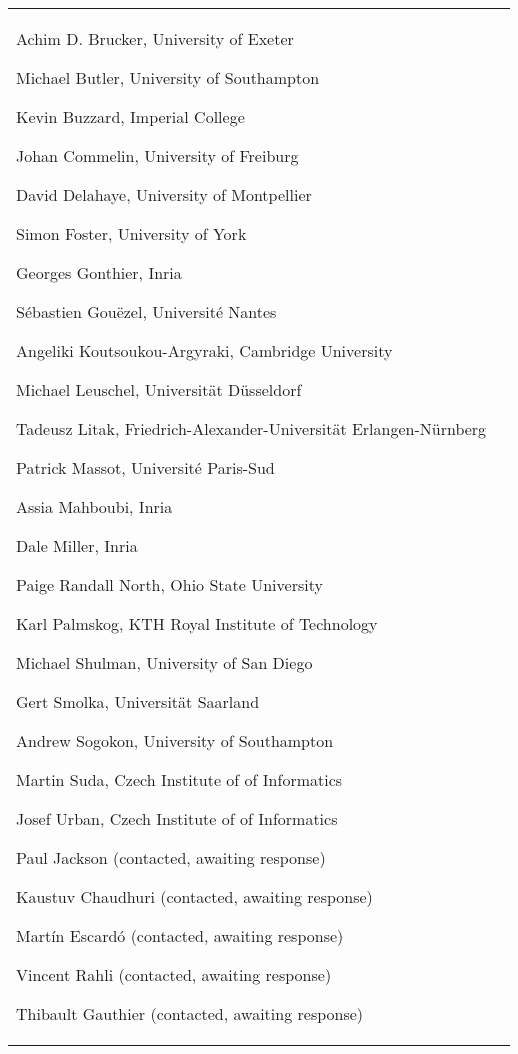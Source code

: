\begin{longtable}{|p{}|p{}|}
\begin{framed}
\begin{compactitem}
\item Achim D. Brucker, University of Exeter
\item Michael Butler, University of Southampton
\item Kevin Buzzard, Imperial College %
\item Johan Commelin, University of Freiburg
\item David Delahaye, University of Montpellier %
\item Simon Foster, University of York
\item Georges Gonthier, Inria
\item Sébastien Gouëzel, Université Nantes %
\item Angeliki Koutsoukou-Argyraki, Cambridge University %
\item Michael Leuschel, Universität Düsseldorf
\item Tadeusz Litak, Friedrich-Alexander-Universität Erlangen-Nürnberg
\item Patrick Massot, Université Paris-Sud %
\item Assia Mahboubi, Inria %
\item Dale Miller, Inria
\item Paige Randall North, Ohio State University
\item Karl Palmskog,  KTH Royal Institute of Technology %
\item Michael Shulman, University of San Diego
\item Gert Smolka, Universität Saarland %
\item Andrew Sogokon, University of Southampton
\item Martin Suda, Czech Institute of of Informatics
\item Josef Urban, Czech Institute of of Informatics



\item Paul Jackson (contacted, awaiting response)
\item Kaustuv Chaudhuri (contacted, awaiting response)
\item Martín Escardó (contacted, awaiting response)
\item Vincent Rahli (contacted, awaiting response)
\item Thibault Gauthier (contacted, awaiting response)





\end{compactitem}
\end{framed}
\end{longtable}
